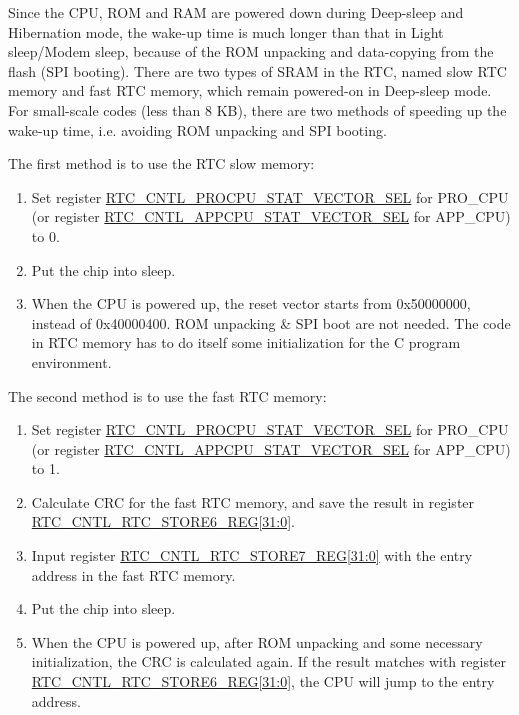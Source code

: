 \documentclass[main\_\_EN.tex]{subfiles}
\begin{document}
Since the CPU, ROM and RAM are powered down during Deep-sleep and Hibernation mode, the wake-up time is much longer than that in Light sleep/Modem sleep, because of the ROM unpacking and data-copying from the flash (SPI booting). There are two types of SRAM in the RTC, named slow RTC memory and fast RTC memory, which remain powered-on in Deep-sleep mode. For small-scale codes (less than 8 KB), there are two methods of speeding up the wake-up time, i.e. avoiding ROM unpacking and SPI booting.

The first method is to use the RTC slow memory:

\begin{enumerate}
    \item Set register \hyperref[regdesc:RTCCNTLRESETSTATEREG]{RTC\_CNTL\_PROCPU\_STAT\_VECTOR\_SEL} for PRO\_CPU (or register \hyperref[regdesc:RTCCNTLRESETSTATEREG]{RTC\_CNTL\_APPCPU\_STAT\_VECTOR\_SEL} for APP\_CPU) to 0.
    \item Put the chip into sleep.
    \item When the CPU is powered up, the reset vector starts from 0x50000000, instead of 0x40000400. ROM unpacking \& SPI boot are not needed. The code in RTC memory has to do itself some initialization for the C program environment.
\end{enumerate}

The second method is to use the fast RTC memory:

\begin{enumerate}
    \item Set register \hyperref[regdesc:RTCCNTLRESETSTATEREG]{RTC\_CNTL\_PROCPU\_STAT\_VECTOR\_SEL} for PRO\_CPU (or register \hyperref[regdesc:RTCCNTLRESETSTATEREG]{RTC\_CNTL\_APPCPU\_STAT\_VECTOR\_SEL} for APP\_CPU) to 1.
    \item Calculate CRC for the fast RTC memory, and save the result in register \hyperref[regdesc:RTCCNTLSTORE1nREG]{RTC\_CNTL\_RTC\_STORE6\_REG[31:0]}.
    \item Input register \hyperref[regdesc:RTCCNTLSTORE1nREG]{RTC\_CNTL\_RTC\_STORE7\_REG[31:0]} with the entry address in the fast RTC memory.
    \item Put the chip into sleep.
    \item When the CPU is powered up, after ROM unpacking and some necessary initialization, the CRC is calculated again. If the result matches with register \hyperref[regdesc:RTCCNTLSTORE1nREG]{RTC\_CNTL\_RTC\_STORE6\_REG[31:0]}, the CPU will jump to the entry address.
\end{enumerate}
\end{document}
